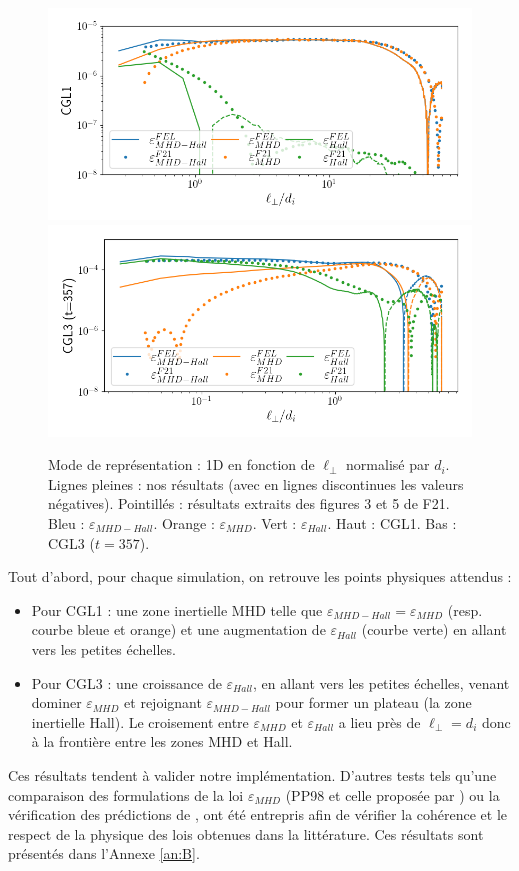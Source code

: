 \begin{figure}[!ht]
 \centering
\includegraphics[width=0.9\linewidth,trim=0.5cm 0.5cm 0.5cm 0.5cm, clip=true]{./Part_3/images_ch2/CGL1_compainc}
\includegraphics[width=0.9\linewidth,trim=0.5cm 0.5cm 0.5cm 0.5cm, clip=true]{./Part_3/images_ch2/CGL3_compainc}
\cprotect\caption{Mode de représentation : \acs{1D} en fonction de $\ell_{\perp}$ normalisé par $d_i$. Lignes pleines : nos résultats (avec en lignes discontinues les valeurs négatives). Pointillés : résultats extraits des figures 3 et 5 de \ac{F21}. Bleu : $\varepsilon_{MHD-Hall}$. Orange : $\varepsilon_{MHD}$. Vert : $\varepsilon_{Hall}$. Haut : CGL1. Bas : CGL3 ($t =\num{357}$).}
\label{fig:compainc}
\end{figure}

Tout d'abord, pour chaque simulation, on retrouve les points physiques attendus : 
\begin{itemize}
    \item Pour CGL1 : une zone inertielle \ac{MHD} telle que $\varepsilon_{MHD-Hall} = \varepsilon_{MHD}$ (resp. courbe bleue et orange) et une augmentation de $\varepsilon_{Hall}$ (courbe verte) en allant vers les petites échelles.
    \item Pour CGL3 : une croissance de $\varepsilon_{Hall}$, en allant vers les petites échelles, venant dominer $\varepsilon_{MHD}$ et rejoignant $\varepsilon_{MHD-Hall}$ pour former un plateau (la zone inertielle \acs{Hall}). Le croisement entre $\varepsilon_{MHD}$ et $\varepsilon_{Hall}$ a lieu près de $\ell_{\perp} = d_i$ donc à la frontière entre les zones \ac{MHD} et \acs{Hall}.
\end{itemize}
Ces résultats tendent à valider notre implémentation. D'autres tests tels qu'une comparaison des formulations de la loi $\varepsilon_{MHD}$ (\acs{PP98} et celle proposée par \cite{banerjee_exact_2017} ) ou la vérification des prédictions de \cite{andres_energy_2018}, ont été entrepris afin de vérifier la cohérence et le respect de la physique des lois obtenues dans la littérature. Ces résultats sont présentés dans l'Annexe \ref{an:B}.


